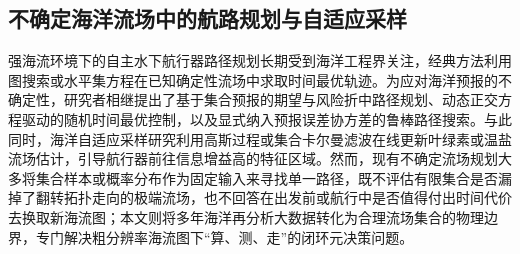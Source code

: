 \subsection{不确定海洋流场中的航路规划与自适应采样}
强海流环境下的自主水下航行器路径规划长期受到海洋工程界关注，经典方法利用图搜索或水平集方程在已知确定性流场中求取时间最优轨迹\cite{dijkstra1959note,lolla2014levelset}。为应对海洋预报的不确定性，研究者相继提出了基于集合预报的期望与风险折中路径规划、动态正交方程驱动的随机时间最优控制，以及显式纳入预报误差协方差的鲁棒路径搜索\cite{wang2016path,subramani2018stochastic,kularatne2018forecast}。与此同时，海洋自适应采样研究利用高斯过程或集合卡尔曼滤波在线更新叶绿素或温盐流场估计，引导航行器前往信息增益高的特征区域\cite{anderson2001eakf,srinivas2012gpucb,hollinger2014sampling,fossum2019}。然而，现有不确定流场规划大多将集合样本或概率分布作为固定输入来寻找单一路径，既不评估有限集合是否漏掉了翻转拓扑走向的极端流场，也不回答在出发前或航行中是否值得付出时间代价去换取新海流图；本文则将多年海洋再分析大数据转化为合理流场集合的物理边界，专门解决粗分辨率海流图下“算、测、走”的闭环元决策问题。
